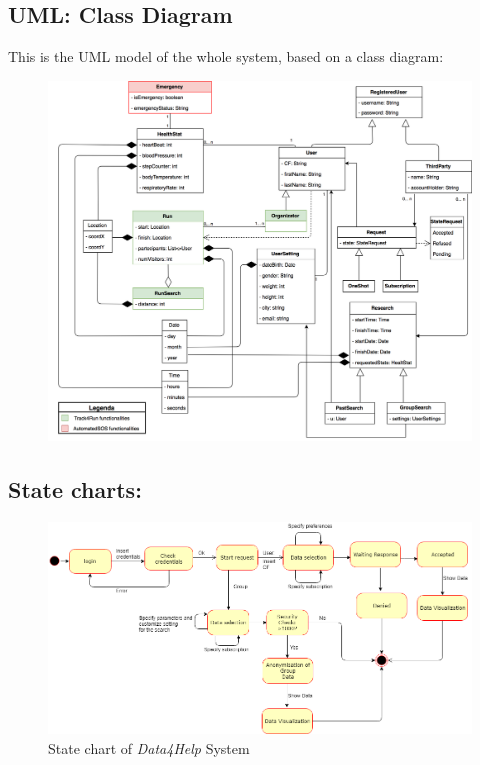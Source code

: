 \subsection{UML: Class Diagram}
This is the UML model of the whole system, based on a class diagram:
\begin{figure}[H]
    \centering
    \includegraphics[scale=0.2]{Pictures/UML.png}

\end{figure}

\newpage
\subsection{State charts:}

\begin{figure}[H]
    \centering
    \includegraphics[scale=0.4]{Pictures/stateChart1.png}
    \caption{State chart of \emph{Data4Help} System}
\end{figure}

